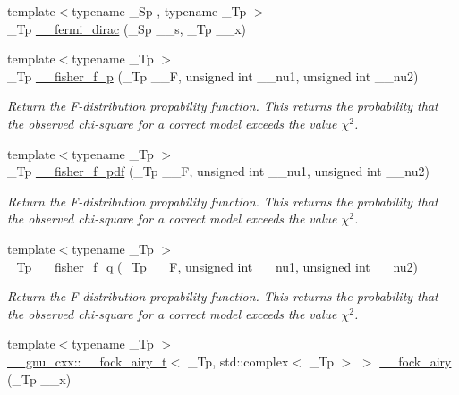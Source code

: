 \begin{DoxyCompactItemize}
{\footnotesize template$<$typename \+\_\+\+Sp , typename \+\_\+\+Tp $>$ }\\\+\_\+\+Tp \hyperlink{namespacestd_1_1____detail_a470e563c4e88c433f94dca391814dc61}{\+\_\+\+\_\+fermi\+\_\+dirac} (\+\_\+\+Sp \+\_\+\+\_\+s, \+\_\+\+Tp \+\_\+\+\_\+x)
\item 
{\footnotesize template$<$typename \+\_\+\+Tp $>$ }\\\+\_\+\+Tp \hyperlink{namespacestd_1_1____detail_aee8f7c61fee93660eede2ed37cf58386}{\+\_\+\+\_\+fisher\+\_\+f\+\_\+p} (\+\_\+\+Tp \+\_\+\+\_\+F, unsigned int \+\_\+\+\_\+nu1, unsigned int \+\_\+\+\_\+nu2)
\begin{DoxyCompactList}\small\item\em Return the F-\/distribution propability function. This returns the probability that the observed chi-\/square for a correct model exceeds the value $ \chi^2 $. \end{DoxyCompactList}\item 
{\footnotesize template$<$typename \+\_\+\+Tp $>$ }\\\+\_\+\+Tp \hyperlink{namespacestd_1_1____detail_a2f85415264800034e969f86ac8294f7b}{\+\_\+\+\_\+fisher\+\_\+f\+\_\+pdf} (\+\_\+\+Tp \+\_\+\+\_\+F, unsigned int \+\_\+\+\_\+nu1, unsigned int \+\_\+\+\_\+nu2)
\begin{DoxyCompactList}\small\item\em Return the F-\/distribution propability function. This returns the probability that the observed chi-\/square for a correct model exceeds the value $ \chi^2 $. \end{DoxyCompactList}\item 
{\footnotesize template$<$typename \+\_\+\+Tp $>$ }\\\+\_\+\+Tp \hyperlink{namespacestd_1_1____detail_ab3a5fe5d7e73a36a2d22d6093dfa0c55}{\+\_\+\+\_\+fisher\+\_\+f\+\_\+q} (\+\_\+\+Tp \+\_\+\+\_\+F, unsigned int \+\_\+\+\_\+nu1, unsigned int \+\_\+\+\_\+nu2)
\begin{DoxyCompactList}\small\item\em Return the F-\/distribution propability function. This returns the probability that the observed chi-\/square for a correct model exceeds the value $ \chi^2 $. \end{DoxyCompactList}\item 
{\footnotesize template$<$typename \+\_\+\+Tp $>$ }\\\hyperlink{struct____gnu__cxx_1_1____fock__airy__t}{\+\_\+\+\_\+gnu\+\_\+cxx\+::\+\_\+\+\_\+fock\+\_\+airy\+\_\+t}$<$ \+\_\+\+Tp, std\+::complex$<$ \+\_\+\+Tp $>$ $>$ \hyperlink{namespacestd_1_1____detail_a482936d128727bf73a5953639fd3a7e0}{\+\_\+\+\_\+fock\+\_\+airy} (\+\_\+\+Tp \+\_\+\+\_\+x)

\end{DoxyCompactItemize}
